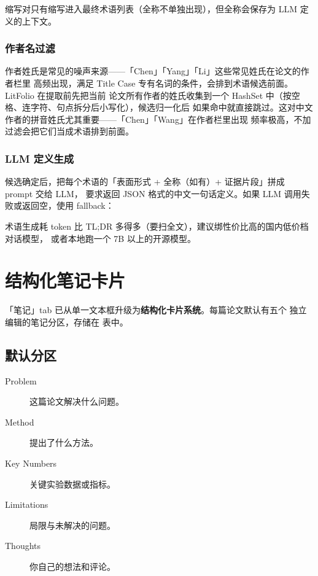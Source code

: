 缩写对只有缩写进入最终术语列表（全称不单独出现），但全称会保存为 LLM 定义的上下文。

\subsubsection{作者名过滤}

作者姓氏是常见的噪声来源——「Chen」「Yang」「Li」这些常见姓氏在论文的作者栏里
高频出现，满足 Title Case 专有名词的条件，会排到术语候选前面。LitFolio 在提取前先把当前
论文所有作者的姓氏收集到一个 HashSet 中（按空格、连字符、句点拆分后小写化），候选归一化后
如果命中就直接跳过。这对中文作者的拼音姓氏尤其重要——「Chen」「Wang」在作者栏里出现
频率极高，不加过滤会把它们当成术语排到前面。

\subsubsection{LLM 定义生成}

候选确定后，把每个术语的「表面形式 + 全称（如有）+ 证据片段」拼成 prompt 交给 LLM，
要求返回 JSON 格式的中文一句话定义。如果 LLM 调用失败或返回空，使用 fallback：

\begin{tipbox}
术语生成耗 token 比 TL;DR 多得多（要扫全文），建议绑性价比高的国内低价档对话模型，
或者本地跑一个 7B 以上的开源模型。
\end{tipbox}

\section{结构化笔记卡片}

「笔记」tab 已从单一文本框升级为\textbf{结构化卡片系统}。每篇论文默认有五个
独立编辑的笔记分区，存储在  表中。

\subsection{默认分区}

\begin{description}
  \item[Problem] 这篇论文解决什么问题。
  \item[Method] 提出了什么方法。
  \item[Key Numbers] 关键实验数据或指标。
  \item[Limitations] 局限与未解决的问题。
  \item[Thoughts] 你自己的想法和评论。
\end{description}

